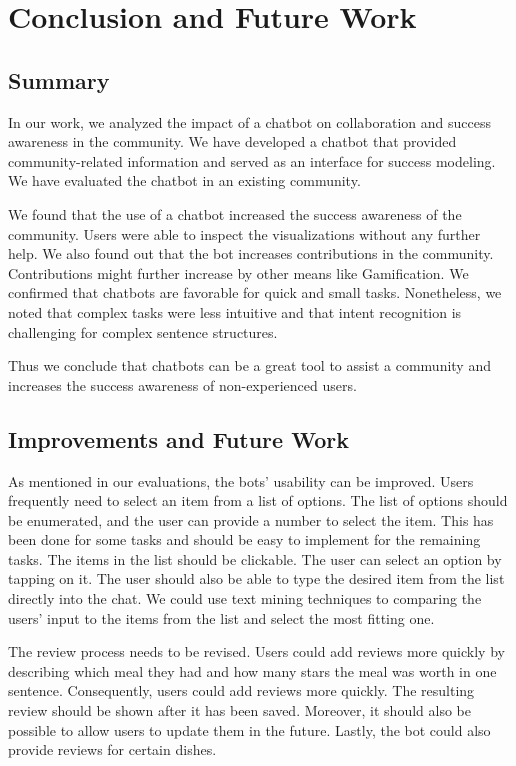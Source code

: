 \chapter{Conclusion and Future Work}

\section{Summary}
In our work, we analyzed the impact of a chatbot on collaboration and success awareness in the community. We have developed a chatbot that provided community-related information and served as an interface for success modeling.  We have evaluated the chatbot in an existing community.

We found that the use of a chatbot increased the success awareness of the community. Users were able to inspect the visualizations without any further help.
We also found out that the bot increases contributions in the community. Contributions might further increase by other means like Gamification. 
We confirmed that chatbots are favorable for quick and small tasks. Nonetheless, we noted that complex tasks were less intuitive and that intent recognition is challenging for complex sentence structures.

Thus we conclude that chatbots can be a great tool to assist a community and increases the success awareness of non-experienced users.  


\section{Improvements and Future Work}
As mentioned in our evaluations, the bots' usability can be improved.
Users frequently need to select an item from a list of options. 
The list of options should be enumerated, and the user can provide a number to select the item. This has been done for some tasks and should be easy to implement for the remaining tasks.
The items in the list should be clickable. The user can select an option by tapping on it. 
The user should also be able to type the desired item from the list directly into the chat. We could use text mining techniques to comparing the users' input to the items from the list and select the most fitting one.

The review process needs to be revised. Users could add reviews more quickly by describing which meal they had and how many stars the meal was worth in one sentence. Consequently, users could add reviews more quickly. The resulting review should be shown after it has been saved. Moreover, it should also be possible to allow users to update them in the future. Lastly, the bot could also provide reviews for certain dishes.

